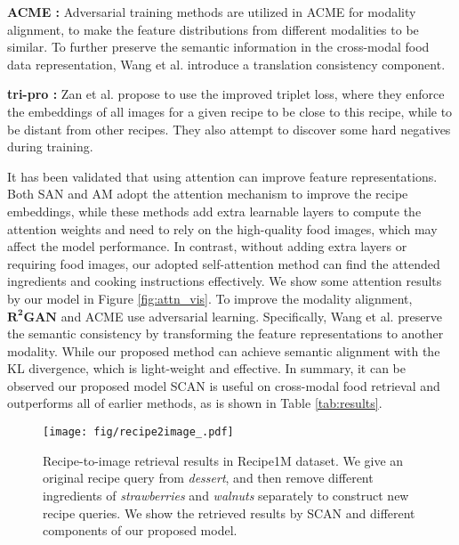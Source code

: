 \documentclass[journal]{IEEEtran}
\begin{document}
\textbf{ACME \cite{wang2019learning}:} Adversarial training methods are utilized in ACME for modality alignment, to make the feature distributions from different modalities to be similar. To further preserve the semantic information in the cross-modal food data representation, Wang et al. introduce a translation consistency component.

\textbf{tri-pro \cite{zan2020sentence}:} Zan et al. propose to use the improved triplet loss, where they enforce the embeddings of all images for a given recipe to be close to this recipe, while to be distant from other recipes. They also attempt to discover some hard negatives during training.

It has been validated that using attention can improve feature representations. Both SAN \cite{chen2017cross} and AM \cite{chen2018deep} adopt the attention mechanism to improve the recipe embeddings, while these methods add extra learnable layers to compute the attention weights and need to rely on the high-quality food images, which may affect the model performance. In contrast, without adding extra layers or requiring food images, our adopted self-attention method can find the attended ingredients and cooking instructions effectively. We show some attention results by our model in Figure \ref{fig:attn_vis}. To improve the modality alignment, $\mathbf{R^2 GAN}$ \cite{zhu2019r2gan} and ACME \cite{wang2019learning} use adversarial learning. Specifically, Wang et al. \cite{wang2019learning} preserve the semantic consistency by transforming the feature representations to another modality. While our proposed method can achieve semantic alignment with the KL divergence, which is light-weight and effective. In summary, it can be observed our proposed model SCAN is useful on cross-modal food retrieval and outperforms all of earlier methods, as is shown in Table \ref{tab:results}.


\begin{figure*}
\begin{center}
\texttt{[image: fig/recipe2image\_.pdf]}
\end{center}
   \caption{Recipe-to-image retrieval results in Recipe1M dataset. We give an original recipe query from \emph{dessert}, and then remove different ingredients of \emph{strawberries} and \emph{walnuts} separately to construct new recipe queries. We show the retrieved results by SCAN and different components of our proposed model.}
\label{fig:re2im}
\end{figure*}
\end{document}
